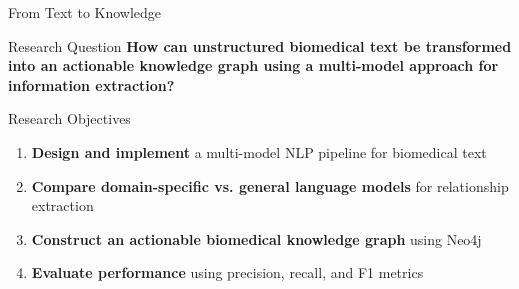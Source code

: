 \documentclass[aspectratio=169, 11pt]{beamer}
\begin{document}
\begin{frame}{From Text to Knowledge}
    \vspace{0.8cm}
    \begin{center}
    \end{center}
    
    \vspace{0.8cm}
    \begin{block}{Research Question}
        \textbf{How can unstructured biomedical text be transformed into an actionable knowledge graph using a multi-model approach for information extraction?}
    \end{block}
\end{frame}

\begin{frame}{Research Objectives}
    \vspace{0.5cm}
    \begin{enumerate}
        \setlength{\itemsep}{0.6cm}
        \item \textbf{Design and implement} a multi-model NLP pipeline for biomedical text
        
        \item \textbf{Compare domain-specific vs. general language models} for relationship extraction
        
        \item \textbf{Construct an actionable biomedical knowledge graph} using Neo4j


        \item \textbf{Evaluate performance} using precision, recall, and F1 metrics
    \end{enumerate}
\end{frame}
\end{document}
